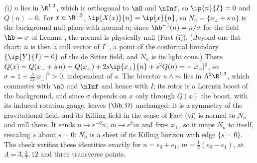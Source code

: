 \emph{(i)} $n$ lies in $\R^{1,3}$, which is orthogonal to $\nO$ and $\nInf$, so $\ip{n}{I} = 0$ and $Q(n) = 0$. For $x \in \R^{1,3}$, $\ip{X(x)}{n} = \ip{x}{n}$, so $N_{n} = \{x_{\perp} + s\,n\}$ is the background null plane with normal $n$; since $\hb^{-1}(n) = n/\sigma$ for the field $\hb = \sigma$ of Lemma , the normal is physically null (Fact (i)). (Beyond one flat chart: $n$ is then a null vector of $I^{\perp}$, a point of the conformal boundary $\{\ip{Y}{I} = 0\}$ of the de Sitter field, and $N_{n}$ is its light cone.) There $Q(x) = Q(x_{\perp} + s\,n) = Q(x_{\perp}) + 2s\ip{x_{\perp}}{n} + s^{2}Q(n) = -|x_{\perp}|^{2}$, so $\sigma = 1 + \tfrac{\Lambda}{12}|x_{\perp}|^{2} > 0$, independent of $s$. The bivector $n \wedge m$ lies in $\Lambda^{2}\R^{1,3}$, which commutes with $\nO$ and $\nInf$ and hence with $I$; its rotor is a Lorentz boost of the background, and since $\sigma$ depends on $x$ only through $Q(x)$ the boost, with its induced rotation gauge, leaves $(\hb, \Omega)$ unchanged: it is a symmetry of the gravitational field, and its Killing field in the sense of Fact (vi) is normal to $N_{n}$ and null there. It sends $n \mapsto e^{-\theta}n$, $m \mapsto e^{\theta}m$ and fixes $x_{\perp}$, so it maps $N_{n}$ to itself, rescaling $s$ about $s = 0$: $N_{n}$ is a sheet of its Killing horizon with edge $\{s = 0\}$. The check verifies these identities exactly for $n = e_{0} + e_{1}$, $m = \tfrac12(e_{0} - e_{1})$, at $\Lambda = 3, \tfrac37, 12$ and three transverse points.

